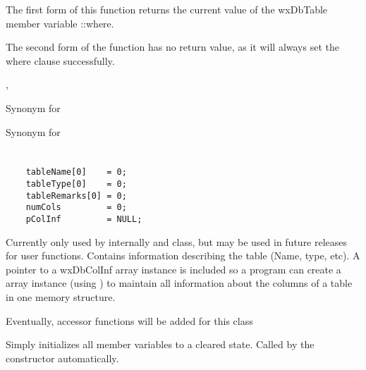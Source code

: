 


The first form of this function returns the current value of the wxDbTable 
member variable ::where.  

The second form of the function has no return value, as it will always set 
the where clause successfully. 


, 



\label{wxdbtableplusplus}


Synonym for 




\label{wxdbtableminusminus}


Synonym for 




\section{}\label{wxdbtableinf}

\begin{verbatim}
    tableName[0]    = 0;
    tableType[0]    = 0;
    tableRemarks[0] = 0;
    numCols         = 0;
    pColInf         = NULL;
\end{verbatim}


Currently only used by  internally 
and  class, but may be used in future releases for 
user functions.  Contains information describing the table (Name, type, etc). 
A pointer to a wxDbColInf array instance is included so a program can create a 
 array instance (using 
) 
to maintain all information about the columns of a table in one memory 
structure.

Eventually, accessor functions will be added for this class

\label{wxdbtableinfinitialize}

Simply initializes all member variables to a cleared state.  Called by 
the constructor automatically.

